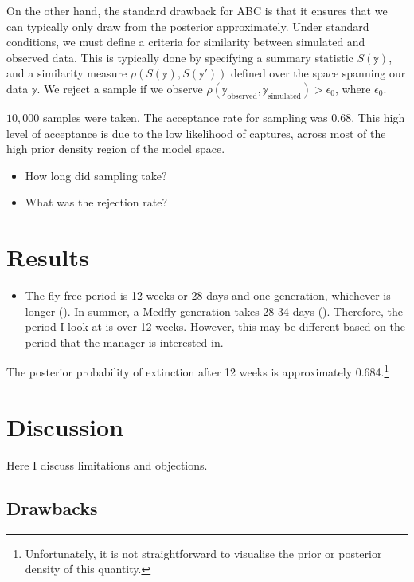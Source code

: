 \documentclass[
]{book}
\providecommand{\tightlist}{%
  \setlength{\itemsep}{0pt}\setlength{\parskip}{0pt}}
\begin{document}
On the other hand, the standard drawback for ABC is that it ensures that we can typically only draw from the posterior approximately. Under standard conditions, we must define a criteria for similarity between simulated and observed data. This is typically done by specifying a summary statistic \(S(\mathbb y)\), and a similarity measure \(\rho(S(\mathbb y), S(\mathbb y'))\) defined over the space spanning our data \(\mathbb y\). We reject a sample if we observe \(\rho(\mathbb y_{\text{observed}}, \mathbb y_{\text{simulated}} ) > \epsilon_0\), where \(\epsilon_0\).

\(10{,}000\) samples were taken. The acceptance rate for sampling was 0.68. This high level of acceptance is due to the low likelihood of captures, across most of the high prior density region of the model space.

\begin{itemize}
\tightlist
\item
  How long did sampling take?
\item
  What was the rejection rate?
\end{itemize}

\hypertarget{results}{%
\section{Results}\label{results}}

\begin{itemize}
\tightlist
\item
  The fly free period is 12 weeks or 28 days and one generation, whichever is longer (\citet{meats2005}). In summer, a Medfly generation takes 28-34 days (\citet{dpirdwa}). Therefore, the period I look at is over 12 weeks. However, this may be different based on the period that the manager is interested in.
\end{itemize}

The posterior probability of extinction after 12 weeks is approximately 0.684.\footnote{Unfortunately, it is not straightforward to visualise the prior or posterior density of this quantity.}

\hypertarget{discussion}{%
\section{Discussion}\label{discussion}}

Here I discuss limitations and objections.

\hypertarget{drawbacks}{%
\subsection{Drawbacks}\label{drawbacks}}
\end{document}
